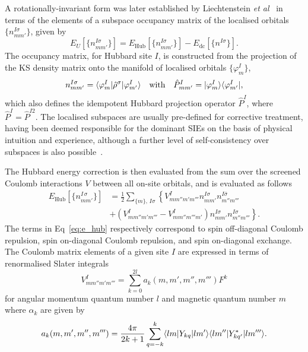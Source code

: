 {A rotationally-invariant form
was later established 
by Liechtenstein {\it et al}~\cite{PhysRevB.52.R5467,PhysRevB.56.4900,0953-8984-9-35-010} 
in terms of the elements of 
a subspace occupancy matrix 
of the localised orbitals 
$\{n_{mm'}^{I\sigma}\}$,
given by  
%
\begin{equation}
E_U[\{n_{mm'}^{I\sigma}\}]=E_\textrm{Hub}[\{n_{mm'}^{I\sigma}\}]
-E_\textrm{dc}[\{n^{I\sigma}\}].
\label{eq:hubbard2}
\end{equation}
%
The occupancy matrix, 
for Hubbard site $I$, 
is constructed from 
the projection of the KS density matrix 
onto the manifold of 
localised orbitals 
$\{\varphi^I_m\}$, 
%
\begin{equation}
n_{mm'}^{I\sigma}=\langle\varphi^I_m\vert\hat{\rho}^{\sigma}\vert\varphi^I_{m'}\rangle
\quad\mbox{with}\quad
\hat{P}^I_{mm'}=\vert\varphi^I_{m}\rangle\langle\varphi^I_{m'}\vert, 
\end{equation}
%
which also defines the idempotent 
Hubbard projection operator $\hat{P}^I$, 
where 
$\hat{P}^I=\hat{P}^{I2}$.
%
The localised subspaces are usually 
pre-defined for corrective treatment,
having been deemed responsible 
for the dominant SIEs on the basis of physical intuition
and experience, 
although a further level of 
self-consistency over subspaces 
is also possible~\cite{PhysRevB.82.081102}.

The Hubbard energy correction   
is then evaluated from the 
sum over the screened Coulomb interactions $V$ 
between all on-site orbitals, 
and is evaluated as follows
%
\begin{align}
E_\textrm{Hub}[\{n^{I\,\sigma}_{mm'}\}]
&=\frac{1}{2}\sum_{\{m\},\, I\sigma}\left\{V_{mm''m'm'''}^In^{I\sigma}_{mm'}n^{I\bar\sigma}_{m''m'''}\right.\nonumber \\[0.5em]
&+\left(V_{mm''m'm'''}^I- V_{mm''m'''m'}^I\right)\left.n^{I\sigma}_{mm'}n^{I\sigma}_{m''m'''}\right\}.
\label{eq:e_hub}
\end{align}
%
The terms in Eq~\eqref{eq:e_hub} 
respectively correspond to 
spin off-diagonal Coulomb repulsion, 
spin on-diagonal Coulomb repulsion, 
and spin on-diagonal exchange.
%
The Coulomb matrix elements 
of a given site $I$ 
are expressed in terms of 
renormalised Slater integrals 
%
%
\begin{equation}
V_{mm''m'm'''}^I=\sum_{k=0}^{2l}a_k(m,m',m'',m''')F^k 
\label{eq:slater_integrals}
\end{equation}
%
for angular momentum quantum number $l$ 
and magnetic quantum number $m$ 
where $\alpha_k$ are given by
%
\begin{equation}
a_k(m,m',m'',m''')=\frac{4\pi}{2k+1}\sum^{k}_{q=-k}\langle lm\vert{Y}_{kq}\vert lm'\rangle\langle lm''\vert{Y}^*_{kq'}\vert lm'''\rangle.
\label{eq:coefficients}
\end{equation}
%

}
